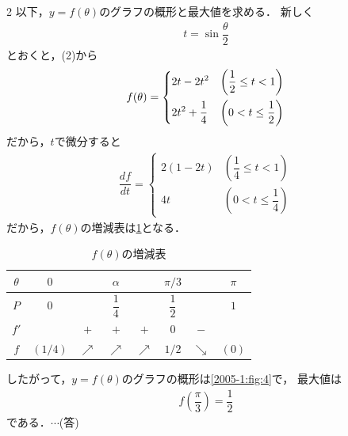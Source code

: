 \documentclass[../../main.tex]{subfiles}
\begin{document}
\begin{multicols}{2}
  以下，$y=f(\theta)$のグラフの概形と最大値を求める．
  新しく
  \begin{align}
    t = \sin\dfrac{\theta}{2}
  \end{align}
  とおくと，(2)から
  \begin{align}
    f(\theta) =
    \begin{dcases}
      2t - 2t^2          & \left(\dfrac{1}{2} \le t < 1\right) \\
      2t^2 + \dfrac{1}{4} & \left(0 < t \le \dfrac{1}{2}\right)
    \end{dcases}
  \end{align}
  だから，$t$で微分すると
  \begin{align}
    \dfrac{df}{dt} =
    \begin{cases}
      2(1-2t) & \left(\dfrac{1}{4} \le t < 1\right) \\
      4t      & \left(0 < t \le \dfrac{1}{4}\right)
    \end{cases}
  \end{align}
  だから，$f(\theta)$の増減表は\cref{2005-1:table:1}となる．
  \begin{table}[H]
    \centering
    \caption{$f(\theta)$の増減表}
    \label{2005-1:table:1}
    \begin{tabular}{|c||c|c|c|c|c|c|c|}
      \hline
      $\theta$ & $0$     &            & $\alpha$      &            & $\pi/3$       &            & $\pi$ \\
      \hline
      $P$      & $0$     &            & $\dfrac{1}{4}$ &            & $\dfrac{1}{2}$ &            & $1$   \\
      \hline
      $f'$     &         & $+$        & $+$           & $+$        & $0$           & $-$        &       \\
      \hline
      $f$      & $(1/4)$ & $\nearrow$ & $\nearrow$    & $\nearrow$ & $1/2$         & $\searrow$ & $(0)$ \\
      \hline
    \end{tabular}
  \end{table}

  したがって，$y=f(\theta)$のグラフの概形は\cref{2005-1:fig:4}で，
  最大値は
  \begin{align}
    f\left(\dfrac{\pi}{3}\right) = \dfrac{1}{2}
  \end{align}
  である．$\cdots$(答)

  \begin{figure}[H]
    \centering
\end{figure}
\end{multicols}
\end{document}
